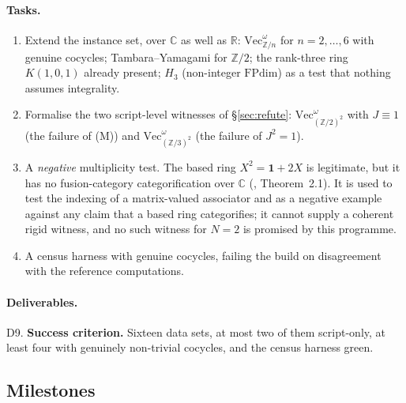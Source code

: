 \documentclass[11pt,a4paper]{article}
\theoremstyle{remark}
\newcommand{\FPdim}{\mathrm{FPdim}}
\newcommand{\Vect}{\mathrm{Vec}}
\newcommand{\one}{\mathbf{1}}
\newcommand{\R}{\mathbb{R}}
\newcommand{\Cx}{\mathbb{C}}
\newcommand{\Z}{\mathbb{Z}}
\begin{document}
\paragraph{Tasks.}
\begin{enumerate}[label=7.\arabic*]
\item Extend the instance set, over $\Cx$ as well as $\R$: $\Vect^{\omega}_{\Z/n}$ for
$n = 2,\dots,6$ with genuine cocycles; Tambara--Yamagami for $\Z/2$; the rank-three ring
$K(1,0,1)$ already present; $H_3$ (non-integer $\FPdim$) as a test that nothing assumes
integrality.
\item Formalise the two script-level witnesses of \S\ref{sec:refute}:
$\Vect^{\omega}_{(\Z/2)^2}$ with $J \equiv 1$ (the failure of (M)) and
$\Vect^{\omega}_{(\Z/3)^2}$ (the failure of $J^{2} = 1$).
\item A \emph{negative} multiplicity test. The based ring $X^{2} = \one + 2X$ is legitimate, but
it has no fusion-category categorification over $\Cx$ (\cite{OstrikRank2}, Theorem~2.1). It is used to test
the indexing of a matrix-valued associator and as a negative example against any claim that a
based ring categorifies; it cannot supply a coherent rigid witness, and no such witness for
$N = 2$ is promised by this programme.
\item A census harness with genuine cocycles, failing the build on disagreement with the reference
computations.
\end{enumerate}
\paragraph{Deliverables.} D9. \quad \textbf{Success criterion.} Sixteen data sets, at most two of
them script-only, at least four with genuinely non-trivial cocycles, and the census harness green.

\subsection{Milestones}
\end{document}
